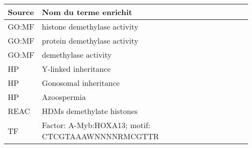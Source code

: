 \begin{longtable}{ll}
\toprule
Source & Nom du terme enrichit\\
\midrule
GO:MF & histone demethylase activity\\
GO:MF & protein demethylase activity\\
GO:MF & demethylase activity\\
HP & Y-linked inheritance\\
HP & Gonosomal inheritance\\
HP & Azoospermia\\
REAC & HDMs demethylate histones\\
TF & Factor: A-Myb:HOXA13; motif: CTCGTAAAWNNNNRMCGTTR\\
\bottomrule
\end{longtable}
